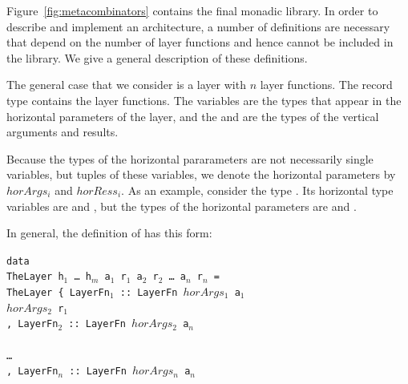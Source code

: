 \documentclass[preprint,natbib]{sigplanconf}
\begin{document}
Figure~\ref{fig:metacombinators} contains the final monadic library. In order to describe and implement an architecture, a number of definitions are necessary that depend on the number of layer functions and hence cannot be included in the library. We give a general description of these definitions.




The general case that we consider is a layer with $n$ layer functions. The record type  contains the layer functions. The  variables are the types that appear in the horizontal parameters of the layer, and the  and  are the types of the vertical arguments and results. 

Because the types of the horizontal pararameters are not necessarily single  variables, but tuples of these variables, we denote the horizontal parameters by $horArgs_i$ and $horRess_i$. As an example, consider the type . Its horizontal  type variables are  and , but the types of the horizontal parameters are  and . 

In general, the definition of  has this form:

\begin{small}
\begin{tabbing}
{\tt da}\={\tt ta}\\
\> {\tt Th}\={\tt eLayer h$_1$ \dots ~h$_m$ a$_1$ r$_1$ a$_2$ r$_2$ \dots ~a$_n$ r$_n$ = }\\
\> \> {\tt TheLayer~}\={\tt \{~LayerFn$_1$}\verb| :: |{\tt LayerFn~}\= {\tt $horArgs_1$ a$_1$}\\
\> \>                \>                                             \> {\tt $horArgs_2$ r$_1$}\\
\>\>\> {\tt , LayerFn$_2$}\verb| :: |{\tt LayerFn~}\={\tt $horArgs_2$ a$_n$}\\
\> \>                \>                            \\
\>\>\> {\tt \dots }\\
\>\>\> {\tt , LayerFn$_n$}\verb| :: |{\tt LayerFn~}\={\tt $horArgs_{n}$ a$_n$}\\
\> \>                \>                            \\
\end{tabbing}
\end{small}
\end{document}
